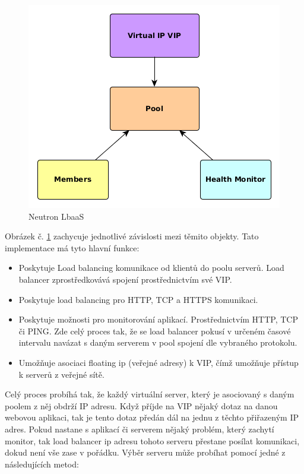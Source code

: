 \begin{figure}[h]
\begin{centering}
\includegraphics[scale=0.63]{images/NeutronLbaaS}
\par\end{centering}
\caption{Neutron LbaaS\label{fig:NeutronLbaaS}}
\end{figure}

Obrázek č. \ref{fig:NeutronLbaaS} zachycuje jednotlivé závislosti mezi těmito objekty. Tato implementace má tyto hlavní funkce:

\begin{itemize}
\item Poskytuje Load balancing komunikace od klientů do poolu serverů. Load balancer zprostředkovává spojení prostřednictvím své VIP.
\item Poskytuje load balancing pro HTTP, TCP a HTTPS komunikaci.
\item Poskytuje možnosti pro monitorování aplikací. Prostřednictvím HTTP, TCP či PING. Zde celý proces tak, že se load balancer pokusí v určeném časové intervalu navázat s daným serverem v pool spojení dle vybraného protokolu.
\item Umožňuje asociaci floating ip (veřejné adresy) k VIP, čímž umožňuje přístup k serverů z veřejné sítě.
\end{itemize}

Celý proces probíhá tak, že každý virtuální server, který je asociovaný s daným poolem z něj obdrží IP adresu. Když příjde na VIP nějaký dotaz na danou webovou aplikaci, tak je tento dotaz předán dál na jednu z těchto přiřazeným IP adres. Pokud nastane s aplikací či serverem nějaký problém, který zachytí monitor, tak load balancer ip adresu tohoto serveru přestane posílat komunikaci, dokud není vše zase v pořádku. Výběr serveru může probíhat pomocí jedné z následujících metod:

